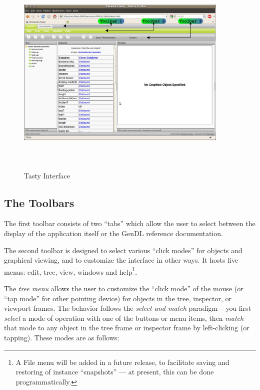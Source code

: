 \documentclass [11pt]{book}
\begin{document}
\begin{figure}
\begin{center}
\includegraphics[width=4in,height=4in]{../images/tasty-shock-absorber-pre.pdf}
\end{center}

\caption{Tasty Interface}

\label{fig:tastyshockabsorberpre}

\end{figure}


\subsection{The Toolbars}

\label{subsec:thetoolbars}



The first toolbar consists of two ``tabs'' which allow the
user to select between the display of the application itself or the
GenDL reference documentation.



The second toolbar is designed to select various ``click modes'' for
objects and graphical viewing, and to customize the interface in other
ways. It hosts five menus: edit, tree, view, windows and
help\footnote{A File menu will be added in a future release, to
facilitate saving and restoring of instance ``snapshots'' --- at
present, this can be done programmatically.}.



The \emph{tree menu} allows the user to customize the ``click mode'' of the
mouse (or ``tap mode'' for other pointing device) for objects in the
tree, inspector, or viewport frames. The behavior follows the \emph{select-and-match} paradigm -- you first \emph{select} a mode of operation with one of the buttons or menu items, 
then \emph{match} that mode to any object in the tree frame or inspector frame by
left-clicking (or tapping). These modes are as follows:
\end{document}
